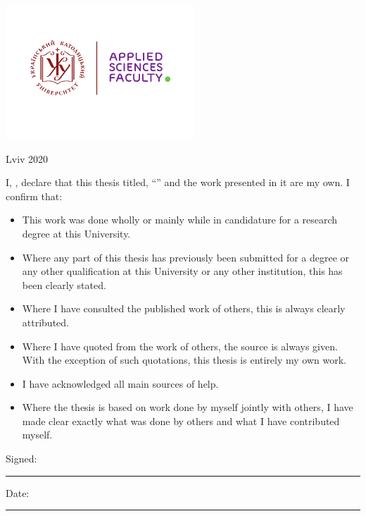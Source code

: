 \documentclass[
11pt, %
english, %
singlespacing, %
headsepline, %
oneside,]{BachelorMasterThesis} %
\begin{document}
\begin{titlepage}
\begin{center}
\vfill
\includegraphics[height=5cm]{UCU-Apps.png} %

\vfill
{\large Lviv 2020}\\[3cm] %
 
\vfill
\end{center}
\end{titlepage}


\begin{declaration}
\addchaptertocentry{\authorshipname} %
\noindent I, \authorname, declare that this thesis titled, \enquote{\ttitle} and the work presented in it are my own. I confirm that:

\begin{itemize} 
\item This work was done wholly or mainly while in candidature for a research degree at this University.
\item Where any part of this thesis has previously been submitted for a degree or any other qualification at this University or any other institution, this has been clearly stated.
\item Where I have consulted the published work of others, this is always clearly attributed.
\item Where I have quoted from the work of others, the source is always given. With the exception of such quotations, this thesis is entirely my own work.
\item I have acknowledged all main sources of help.
\item Where the thesis is based on work done by myself jointly with others, I have made clear exactly what was done by others and what I have contributed myself.\\
\end{itemize}
 
\noindent Signed:\\
\rule[0.5em]{25em}{0.5pt} %
 
\noindent Date:\\
\rule[0.5em]{25em}{0.5pt} %
\end{declaration}
\end{document}
